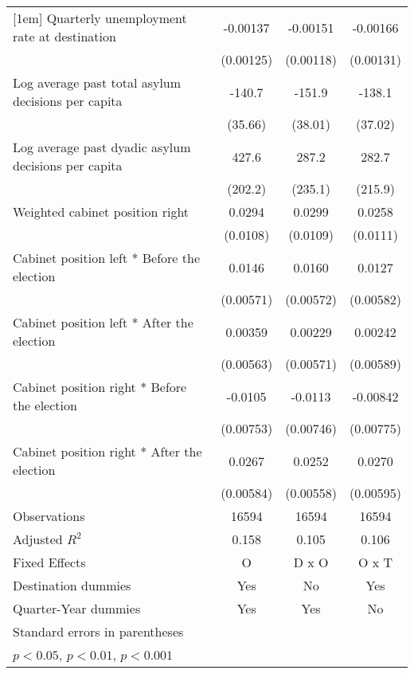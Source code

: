 \begin{table}[htbp]
\begin{tabular}{l*{3}{c}}
[1em]
Quarterly unemployment rate at destination&    -0.00137         &    -0.00151         &    -0.00166         \\
                    &   (0.00125)         &   (0.00118)         &   (0.00131)         \\
[1em]
Log average past total asylum decisions per capita&      -140.7\sym{***}&      -151.9\sym{***}&      -138.1\sym{***}\\
                    &     (35.66)         &     (38.01)         &     (37.02)         \\
[1em]
Log average past dyadic asylum decisions per capita&       427.6\sym{*}  &       287.2         &       282.7         \\
                    &     (202.2)         &     (235.1)         &     (215.9)         \\
[1em]
Weighted cabinet position right&      0.0294\sym{**} &      0.0299\sym{**} &      0.0258\sym{*}  \\
                    &    (0.0108)         &    (0.0109)         &    (0.0111)         \\
[1em]
Cabinet position left * Before the election&      0.0146\sym{*}  &      0.0160\sym{**} &      0.0127\sym{*}  \\
                    &   (0.00571)         &   (0.00572)         &   (0.00582)         \\
[1em]
Cabinet position left * After the election&     0.00359         &     0.00229         &     0.00242         \\
                    &   (0.00563)         &   (0.00571)         &   (0.00589)         \\
[1em]
Cabinet position right * Before the election&     -0.0105         &     -0.0113         &    -0.00842         \\
                    &   (0.00753)         &   (0.00746)         &   (0.00775)         \\
[1em]
Cabinet position right * After the election&      0.0267\sym{***}&      0.0252\sym{***}&      0.0270\sym{***}\\
                    &   (0.00584)         &   (0.00558)         &   (0.00595)         \\
\hline
Observations        &       16594         &       16594         &       16594         \\
Adjusted \(R^{2}\)  &       0.158         &       0.105         &       0.106         \\
Fixed Effects       &           O         &       D x O         &       O x T         \\
Destination dummies &         Yes         &          No         &         Yes         \\
Quarter-Year dummies&         Yes         &         Yes         &          No         \\
\hline\hline
\multicolumn{4}{l}{\footnotesize Standard errors in parentheses}\\
\multicolumn{4}{l}{\footnotesize \sym{*} \(p<0.05\), \sym{**} \(p<0.01\), \sym{***} \(p<0.001\)}\\
\end{tabular}
\end{table}
